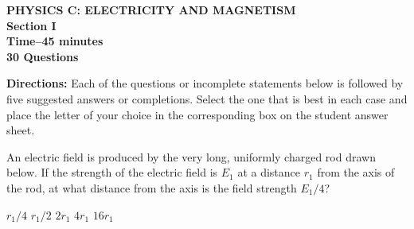 \documentclass[12pt]{../oss-classkick-exam}
\begin{document}
\begin{center}
  \textbf{PHYSICS C: ELECTRICITY AND MAGNETISM\\
    Section I\\
    Time--45 minutes\\
    30 Questions
  }
\end{center}

\textbf{Directions:} Each of the questions or incomplete statements below is
followed by five suggested answers or completions. Select the one that is best
in each case and place the letter of your choice in the corresponding box on
the student answer sheet.

\begin{questions}
%
  
  \question An electric field is produced by the very long, uniformly charged
  rod drawn below. If the strength of the electric field is $E_1$ at a distance
  $r_1$ from the axis of the rod, at what distance from the axis is
  the field strength $E_1/4$?

  \vspace{.1in}
  \begin{minipage}{.35\linewidth}
  \end{minipage}
  \begin{minipage}{.4\linewidth}
    \begin{choices}
      \choice $r_1/4$
      \choice $r_1/2$
      \choice $2r_1$
      \choice $4r_1$
      \choice $16r_1$
    \end{choices}
  \end{minipage}
  


\end{questions}
\end{document}
